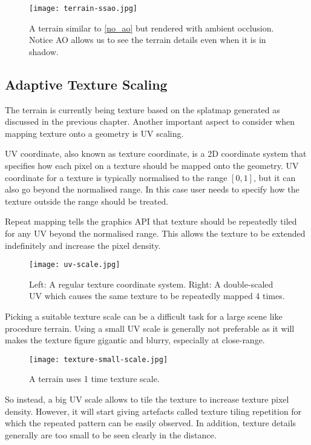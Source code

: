 \documentclass[oneside, a4paper]{report}
\begin{document}
    \begin{figure}[H]
        \texttt{[image: terrain-ssao.jpg]}
        \caption{A terrain similar to \ref{no_ao} but rendered with ambient occlusion. Notice AO allows us to see the terrain details even when it is in shadow.}
    \end{figure}

    \subsection{Adaptive Texture Scaling}

    The terrain is currently being texture based on the splatmap generated as discussed in the previous chapter. Another important aspect to consider when mapping texture onto a geometry is UV scaling.

    UV coordinate, also known as texture coordinate, is a 2D coordinate system that specifies how each pixel on a texture should be mapped onto the geometry. UV coordinate for a texture is typically normalised to the range \([0, 1]\), but it can also go beyond the normalised range. In this case user needs to specify how the texture outside the range should be treated.

    Repeat mapping tells the graphics API that texture should be repeatedly tiled for any UV beyond the normalised range. This allows the texture to be extended indefinitely and increase the pixel density.

    \begin{figure}[H]
        \texttt{[image: uv-scale.jpg]}
        \caption{Left: A regular texture coordinate system. Right: A double-scaled UV which causes the same texture to be repeatedly mapped 4 times.}
    \end{figure}

    Picking a suitable texture scale can be a difficult task for a large scene like procedure terrain. Using a small UV scale is generally not preferable as it will makes the texture figure gigantic and blurry, especially at close-range.

    \begin{figure}[H]
        \texttt{[image: texture-small-scale.jpg]}
        \caption{A terrain uses 1 time texture scale.}
    \end{figure}

    So instead, a big UV scale allows to tile the texture to increase texture pixel density. However, it will start giving artefacts called texture tiling repetition for which the repeated pattern can be easily observed. In addition, texture details generally are too small to be seen clearly in the distance.
\end{document}
